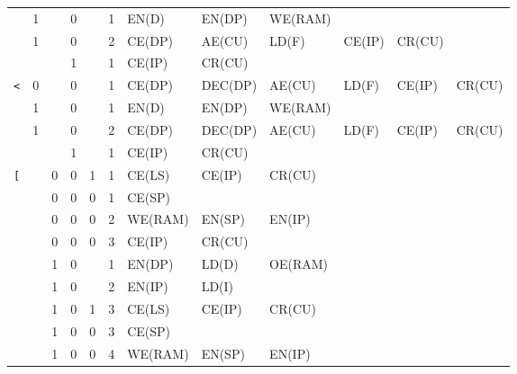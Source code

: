 \begin{landscape}
\begin{longtable}[c] {c|cccc|c|llllll}
    \rowcolor{White}
               & 1 &   & 0     &      & 1     & EN(D)  & EN(DP)  & WE(RAM) &        &        &        \\
    \rowcolor{White}
               & 1 &   & 0     &      & 2     & CE(DP) & AE(CU)  & LD(F)   & CE(IP) & CR(CU) &        \\
    \rowcolor{Gray}
               &   &   & 1     &      & 1     & CE(IP) & CR(CU)  &         &        &        &        \\ \hline
    \rowcolor{White}
    \texttt{<} & 0 &   & 0     &      & 1     & CE(DP) & DEC(DP) & AE(CU)  & LD(F)  & CE(IP) & CR(CU) \\
    \rowcolor{Gray}
               & 1 &   & 0     &      & 1     & EN(D)  & EN(DP)  & WE(RAM) &        &                 \\
    \rowcolor{Gray}
               & 1 &   & 0     &      & 2     & CE(DP) & DEC(DP) & AE(CU)  & LD(F)  & CE(IP) & CR(CU) \\
    \rowcolor{White}
               &   &   & 1     &      & 1     & CE(IP) & CR(CU)  &         &        &        &        \\ \hline
    \rowcolor{Gray}
    \texttt{[} &   & 0 & 0     & 1    & 1     & CE(LS) & CE(IP)  & CR(CU)  &        &        &        \\
    \rowcolor{White}  
               &   & 0 & 0     & 0    & 1     & CE(SP) &         &         &        &        &        \\
    \rowcolor{White}
               &   & 0 & 0     & 0    & 2     & WE(RAM)& EN(SP)  & EN(IP)  &        &        &        \\
    \rowcolor{White}
               &   & 0 & 0     & 0    & 3     & CE(IP) & CR(CU)  &         &        &        &        \\
    \rowcolor{Gray}
               &   & 1 & 0     &      & 1     & EN(DP) & LD(D)   & OE(RAM) &        &        &        \\
    \rowcolor{Gray}
               &   & 1 & 0     &      & 2     & EN(IP) & LD(I)   &         &        &        &        \\
    \rowcolor{Gray}
               &   & 1 & 0     & 1    & 3     & CE(LS)  & CE(IP) & CR(CU)  &        &        &        \\
    \rowcolor{White}
               &   & 1 & 0     & 0    & 3     & CE(SP)  &        &         &        &        &        \\
    \rowcolor{White}
               &   & 1 & 0     & 0    & 4     & WE(RAM) & EN(SP) & EN(IP)  &        &        &        \\

\end{longtable}
\end{landscape}
